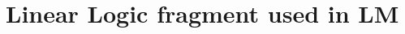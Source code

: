 \begin{comment}
\clearpage
\subsection{Quick-Sort program}\label{code:quicksort}

\begin{figure}[h!]
\footnotesize\begin{Verbatim}[numbers=left]
type back(node, node).
type linear down(node, list int).
type linear up(node, list int).
type linear sorted(node, node, list int).
type linear buildpivot(node, list int, int, list int, list int).
type linear waitpivot(node, node, node, int).
type linear append(node, list int, list int).
type linear reverse(node, list int, list int, list int).
type linear reverse2(node, list int, list int).

down(@0, tosort).

down(A, []) -o up(A, []).
down(A, [X]) -o up(A, [X]).
down(A, [X, Y]), X < Y -o up(A, [X, Y]).
down(A, [X, Y]), X >= Y -o up(A, [Y, X]).
down(A, [X | L]) -o buildpivot(A, L, X, [], []).

buildpivot(A, [], X, Smaller, Greater)
   -o exists B, C. (back(B, A), down(B, Smaller),
            back(C, A), down(C, Greater), waitpivot(A, B, C, X)).

buildpivot(A, [Y | L], X, Smaller, Greater), Y <= X
   -o buildpivot(A, L, X, [Y | Smaller], Greater).
buildpivot(A, [Y | L], X, Smaller, Greater), Y > X
   -o buildpivot(A, L, X, Smaller, [Y | Greater]).
   
waitpivot(A, NodeSmaller, NodeGreater, Pivot),
sorted(A, NodeSmaller, Smaller),
sorted(A, NodeGreater, Greater)
   -o append(A, Smaller, [Pivot | Greater]).

append(A, L1, L2) -o reverse(A, L1, L2, []).

reverse(A, [], L2, L3) -o reverse2(A, L3, L2).
reverse(A, [X | L], L2, L3) -o reverse(A, L, L2, [X | L3]).
reverse2(A, [], Result) -o up(A, Result).
reverse2(A, [X | L1], L2) -o reverse2(A, L1, [X | L2]).

up(A, L), back(A, B) -o sorted(B, A, L).
\end{Verbatim}
\end{figure}
\normalsize
\end{comment}

\clearpage
\section{Linear Logic fragment used in LM}\label{linear_logic}

